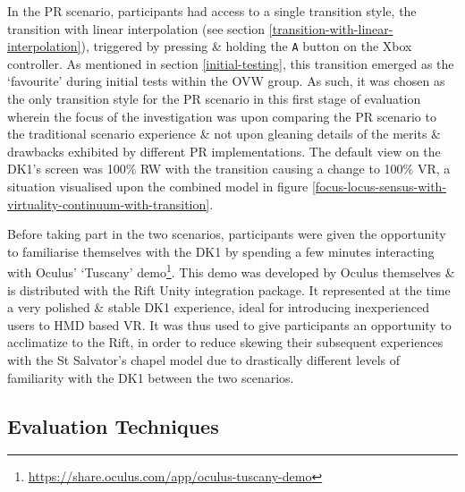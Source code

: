 In the PR scenario, participants had access to a single transition style, the transition with linear interpolation (see section \ref{transition-with-linear-interpolation}), triggered by pressing \& holding the \texttt{A} button on the Xbox controller. As mentioned in section \ref{initial-testing}, this transition emerged as the `favourite' during initial tests within the OVW group. As such, it was chosen as the only transition style for the PR scenario in this first stage of evaluation wherein the focus of the investigation was upon comparing the PR scenario to the traditional scenario experience \& not upon gleaning details of the merits \& drawbacks exhibited by different PR implementations. The default view on the DK1's screen was 100\% RW with the transition causing a change to 100\% VR, a situation visualised upon the combined model in figure \ref{focus-locus-sensus-with-virtuality-continuum-with-transition}.

Before taking part in the two scenarios, participants were given the opportunity to familiarise themselves with the DK1 by spending a few minutes interacting with Oculus' `Tuscany' demo\footnote{\url{https://share.oculus.com/app/oculus-tuscany-demo}}. This demo was developed by Oculus themselves \& is distributed with the Rift Unity integration package. It represented at the time a very polished \& stable DK1 experience, ideal for introducing inexperienced users to HMD based VR. It was thus used to give participants an opportunity to acclimatize to the Rift, in order to reduce skewing their subsequent experiences with the St Salvator's chapel model due to drastically different levels of familiarity with the DK1 between the two scenarios.


\subsection{Evaluation Techniques}

